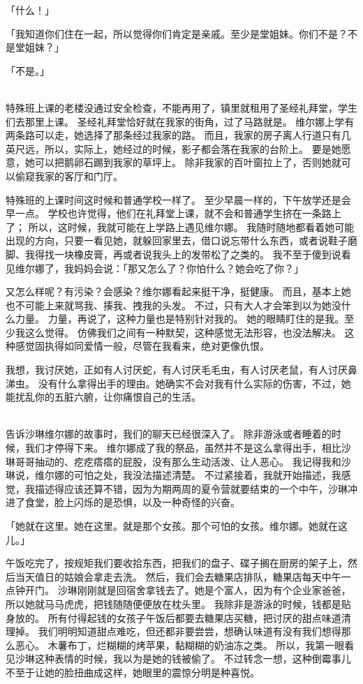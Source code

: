 \documentclass[UTF8]{ctexart}
\begin{document}
「什么！」

「我知道你们住在一起，所以觉得你们肯定是亲戚。至少是堂姐妹。你们不是？不是堂姐妹？」

「不是。」

~\\

特殊班上课的老楼没通过安全检查，不能再用了，镇里就租用了圣经礼拜堂，学生们去那里上课。
圣经礼拜堂恰好就在我家的街角，过了马路就是。
维尔娜上学有两条路可以走，她选择了那条经过我家的路。
而且，我家的房子离人行道只有几英尺远，所以，实际上，她经过的时候，影子都会落在我家的台阶上。
要是她愿意，她可以把鹅卵石踢到我家的草坪上。
除非我家的百叶窗拉上了，否则她就可以偷窥我家的客厅和门厅。

特殊班的上课时间这时候和普通学校一样了。
至少早晨一样的，下午放学还是会早一点。
学校也许觉得，他们在礼拜堂上课，就不会和普通学生挤在一条路上了；
所以，这时候，我就可能在上学路上遇见维尔娜。
我随时随地都看着她可能出现的方向，只要一看见她，就躲回家里去，借口说忘带什么东西，或者说鞋子磨脚、我得找一块橡皮膏，再或者说我头上的发带松了之类的。
我不至于傻到说看见维尔娜了，我妈妈会说：「那又怎么了？你怕什么？她会吃了你？」

又怎么样呢？有污染？会感染？维尔娜看起来挺干净，挺健康。
而且，基本上她也不可能上来就骂我、揍我、拽我的头发。
不过，只有大人才会笨到以为她没什么力量。
力量，再说了，这种力量也是特别针对我的。
她的眼睛盯住的是我。至少我这么觉得。
仿佛我们之间有一种默契，这种感觉无法形容，也没法解决。
这种感觉固执得如同爱情一般，尽管在我看来，绝对更像仇恨。

我想，我讨厌她，正如有人讨厌蛇，有人讨厌毛毛虫，有人讨厌老鼠，有人讨厌鼻涕虫。
没有什么拿得出手的理由。她确实不会对我有什么实际的伤害，不过，她能扰乱你的五脏六腑，让你痛恨自己的生活。

~\\


告诉沙琳维尔娜的故事时，我们的聊天已经很深入了。
除非游泳或者睡着的时候，我们才停得下来。
维尔娜成了我的祭品，虽然并不是这么拿得出手，相比沙琳哥哥抽动的、疙疙瘩瘩的屁股，没有那么生动活泼、让人恶心。
我记得我和沙琳说，维尔娜的可怕之处，我没法描述清楚。
不过紧接着，我就开始描述，我感觉，我描述得应该还算不错，因为为期两周的夏令营就要结束的一个中午，沙琳冲进了食堂，脸上闪烁的是恐惧，以及一种奇怪的兴奋。

「她就在这里。她在这里。就是那个女孩。那个可怕的女孩。维尔娜。她就在这儿。」

午饭吃完了，按规矩我们要收拾东西，把我们的盘子、碟子搁在厨房的架子上，然后当天值日的姑娘会拿走去洗。
然后，我们会去糖果店排队，糖果店每天中午一点钟开门。
沙琳刚刚就是回宿舍拿钱去了。她是个富人，因为有个企业家爸爸，所以她就马马虎虎，把钱随随便便放在枕头里。
我除非是游泳的时候，钱都是贴身放的。
所有付得起钱的女孩子午饭后都要去糖果店买糖，把讨厌的甜点味道清理掉。
我们明明知道甜点难吃，但还都非要尝尝，想确认味道有没有我们想得那么恶心。
木薯布丁，烂糊糊的烤苹果，黏糊糊的奶油冻之类。
所以，我第一眼看见沙琳这种表情的时候，我以为是她的钱被偷了。
不过转念一想，这种倒霉事儿不至于让她的脸扭曲成这样，她眼里的震惊分明是种喜悦。
\end{document}
